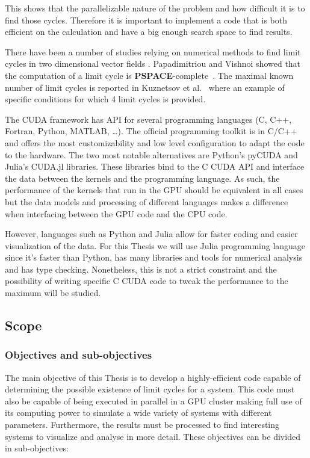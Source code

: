 This shows that the parallelizable nature of the problem and how difficult it is
to find those cycles. Therefore it is important to implement a code that is both
efficient on the calculation and have a big enough search space to find results.

There have been a number of studies relying on numerical methods to find limit
cycles in two dimensional vector fields
\cite{leonov_hidden_2013,van_der_hoff_numerical_2013,casades_computation_2013,gasull_effective_2015}.
Papadimitriou and Vishnoi showed that the computation of a limit cycle is
\textbf{PSPACE}-complete~\cite{papadimitriou_computational_2015}.
The maximal known number of limit cycles is reported in Kuznetsov et
al.~\cite{kuznetsov_visualization_2013} where an example of specific conditions
for which 4 limit cycles is provided.

The CUDA framework has API for several programming languages (C, C++, Fortran,
Python, MATLAB, \dots). The official programming toolkit is in C/C++ and offers
the most customizability and low level configuration to adapt the code to the
hardware. The two most notable alternatives are Python's pyCUDA and Julia's
CUDA.jl libraries. These libraries bind to the C CUDA API and interface the data
between the kernels and the programming language. As such, the performance of
the kernels that run in the GPU should be equivalent in all cases but the data
models and processing of different languages makes a difference when interfacing
between the GPU code and the CPU code.

However, languages such as Python and Julia allow for faster coding and easier
visualization of the data. For this Thesis we will use Julia programming
language since it's faster than Python, has many libraries and tools for
numerical analysis and has type checking.  Nonetheless, this is not a strict
constraint and the possibility of writing specific C CUDA code to tweak the
performance to the maximum will be studied.

\pagebreak
\subsection{Scope}
\subsubsection{Objectives and sub-objectives}

The main objective of this Thesis is to develop a highly-efficient code capable
of determining the possible existence of limit cycles for a system. This code
must also be capable of being executed in parallel in a GPU cluster making full
use of its computing power to simulate a wide variety of systems with different
parameters. Furthermore, the results must be processed to find interesting
systems to visualize and analyse in more detail. These objectives can be divided
in sub-objectives:

